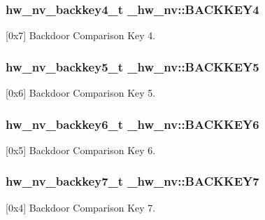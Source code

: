\subsubsection[{\texorpdfstring{B\+A\+C\+K\+K\+E\+Y4}{BACKKEY4}}]{ {\bf hw\+\_\+nv\+\_\+backkey4\+\_\+t} \+\_\+hw\+\_\+nv\+::\+B\+A\+C\+K\+K\+E\+Y4}\hypertarget{struct__hw__nv_afd953f751c993bd8c40e3925acc8d15f}{}\label{struct__hw__nv_afd953f751c993bd8c40e3925acc8d15f}
\mbox{[}0x7\mbox{]} Backdoor Comparison Key 4. 
\subsubsection[{\texorpdfstring{B\+A\+C\+K\+K\+E\+Y5}{BACKKEY5}}]{ {\bf hw\+\_\+nv\+\_\+backkey5\+\_\+t} \+\_\+hw\+\_\+nv\+::\+B\+A\+C\+K\+K\+E\+Y5}\hypertarget{struct__hw__nv_aaac52fb5db07faa7bcb5022c2356e02a}{}\label{struct__hw__nv_aaac52fb5db07faa7bcb5022c2356e02a}
\mbox{[}0x6\mbox{]} Backdoor Comparison Key 5. 
\subsubsection[{\texorpdfstring{B\+A\+C\+K\+K\+E\+Y6}{BACKKEY6}}]{ {\bf hw\+\_\+nv\+\_\+backkey6\+\_\+t} \+\_\+hw\+\_\+nv\+::\+B\+A\+C\+K\+K\+E\+Y6}\hypertarget{struct__hw__nv_a1ddc2ebf50c9f55dcb5462bccabb1009}{}\label{struct__hw__nv_a1ddc2ebf50c9f55dcb5462bccabb1009}
\mbox{[}0x5\mbox{]} Backdoor Comparison Key 6. 
\subsubsection[{\texorpdfstring{B\+A\+C\+K\+K\+E\+Y7}{BACKKEY7}}]{ {\bf hw\+\_\+nv\+\_\+backkey7\+\_\+t} \+\_\+hw\+\_\+nv\+::\+B\+A\+C\+K\+K\+E\+Y7}\hypertarget{struct__hw__nv_a5af6c4683c5e0d4fef69963baf271fd1}{}\label{struct__hw__nv_a5af6c4683c5e0d4fef69963baf271fd1}
\mbox{[}0x4\mbox{]} Backdoor Comparison Key 7. 
